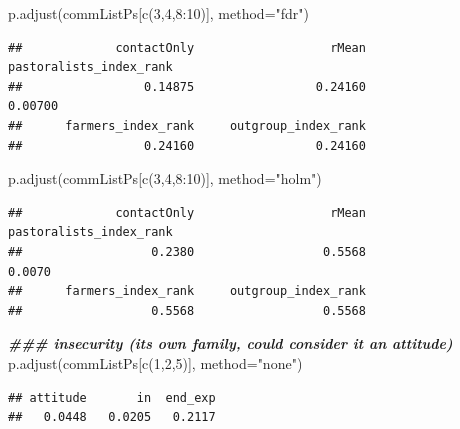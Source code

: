 \documentclass[
]{article}
\newenvironment{Shaded}{\begin{snugshade}}{\end{snugshade}}
\newcommand{\AttributeTok}[1]{\textcolor[rgb]{0.77,0.63,0.00}{#1}}
\newcommand{\DecValTok}[1]{\textcolor[rgb]{0.00,0.00,0.81}{#1}}
\newcommand{\DocumentationTok}[1]{\textcolor[rgb]{0.56,0.35,0.01}{\textbf{\textit{#1}}}}
\newcommand{\FunctionTok}[1]{\textcolor[rgb]{0.00,0.00,0.00}{#1}}
\newcommand{\NormalTok}[1]{#1}
\newcommand{\SpecialCharTok}[1]{\textcolor[rgb]{0.00,0.00,0.00}{#1}}
\newcommand{\StringTok}[1]{\textcolor[rgb]{0.31,0.60,0.02}{#1}}
\begin{document}
\begin{Shaded}
\begin{Highlighting}[]
\FunctionTok{p.adjust}\NormalTok{(commListPs[}\FunctionTok{c}\NormalTok{(}\DecValTok{3}\NormalTok{,}\DecValTok{4}\NormalTok{,}\DecValTok{8}\SpecialCharTok{:}\DecValTok{10}\NormalTok{)], }\AttributeTok{method=}\StringTok{"fdr"}\NormalTok{)}
\end{Highlighting}
\end{Shaded}

\begin{verbatim}
##             contactOnly                   rMean pastoralists_index_rank 
##                 0.14875                 0.24160                 0.00700 
##      farmers_index_rank     outgroup_index_rank 
##                 0.24160                 0.24160
\end{verbatim}

\begin{Shaded}
\begin{Highlighting}[]
\FunctionTok{p.adjust}\NormalTok{(commListPs[}\FunctionTok{c}\NormalTok{(}\DecValTok{3}\NormalTok{,}\DecValTok{4}\NormalTok{,}\DecValTok{8}\SpecialCharTok{:}\DecValTok{10}\NormalTok{)], }\AttributeTok{method=}\StringTok{"holm"}\NormalTok{)}
\end{Highlighting}
\end{Shaded}

\begin{verbatim}
##             contactOnly                   rMean pastoralists_index_rank 
##                  0.2380                  0.5568                  0.0070 
##      farmers_index_rank     outgroup_index_rank 
##                  0.5568                  0.5568
\end{verbatim}

\begin{Shaded}
\begin{Highlighting}[]
\DocumentationTok{\#\#\# insecurity (its own family, could consider it an attitude)}
\FunctionTok{p.adjust}\NormalTok{(commListPs[}\FunctionTok{c}\NormalTok{(}\DecValTok{1}\NormalTok{,}\DecValTok{2}\NormalTok{,}\DecValTok{5}\NormalTok{)], }\AttributeTok{method=}\StringTok{"none"}\NormalTok{)}
\end{Highlighting}
\end{Shaded}

\begin{verbatim}
## attitude       in  end_exp 
##   0.0448   0.0205   0.2117
\end{verbatim}
\end{document}
